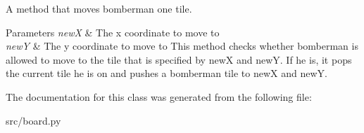 A method that moves bomberman one tile. 


\begin{DoxyParams}{Parameters}
{\em new\+X} & The x coordinate to move to \\
\hline
{\em new\+Y} & The y coordinate to move to This method checks whether bomberman is allowed to move to the tile that is specified by new\+X and new\+Y. If he is, it pops the current tile he is on and pushes a bomberman tile to new\+X and new\+Y. \\
\hline
\end{DoxyParams}


The documentation for this class was generated from the following file\+:\begin{DoxyCompactItemize}
\item 
src/board.\+py\end{DoxyCompactItemize}
